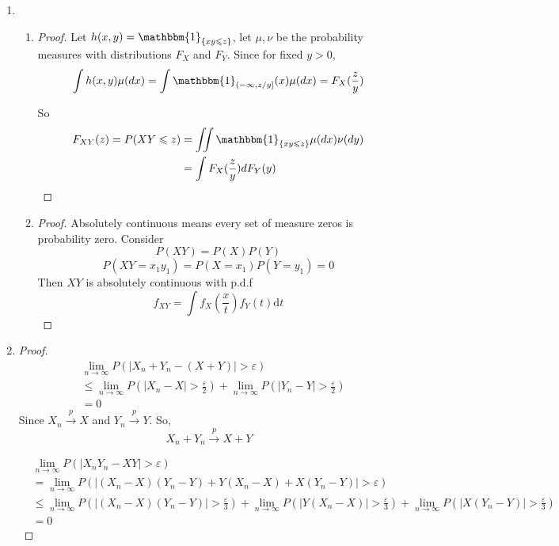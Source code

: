 \documentclass{article}
\begin{document}
\begin{enumerate}
        \item \begin{enumerate}
            \item \begin{proof} 
                Let $h(x,y)=\mathbbm{1}_{\{xy\leqslant z\}}$, let $\mu,\nu$ be the probability measures with distributions $F_X$ and $F_Y$. Since for fixed $y>0$,
                $$\int{h(x,y)\mu(dx)}=\int{\mathbbm{1}_{(-\infty,z/y]}(x)\mu(dx)}=F_X(\frac{z}{y})$$
                
                So
                \begin{align*}
                    F_{XY}(z)=P(XY\leqslant z)&=\iint{\mathbbm{1}_{\{xy\leqslant z\}}\mu(dx)\nu(dy)}\\
                    &=\int F_X(\frac{z}{y})dF_Y(y)
                \end{align*}
            \end{proof}
            \item \begin{proof}
                Absolutely continuous means every set of measure zeros is probability zero. Consider
                $$P(XY)=P(X)P(Y)$$
                $$P(XY=x_1y_1)=P(X=x_1)P(Y=y_1)=0$$
                Then $XY$ is absolutely continuous with p.d.f
                $$f_{XY}=\int f_{X}\left(\frac{x}{t}\right)f_{Y}(t) \text{d}t$$
            \end{proof}
            \end{enumerate}


        \item \begin{proof}
            \begin{align*}
                &\lim_{n\to\infty}P\left(|X_n+Y_n-(X+Y)|> \varepsilon\right)\\
                &\leqslant \lim_{n\to\infty}P\left(|X_n-X|>\frac{\varepsilon}{2}\right)+\lim_{n\to\infty}P\left(|Y_n-Y|>\frac{\varepsilon}{2}\right)\\
                &=0
            \end{align*}
            Since $X_n \overset{p}{\to} X$ and $Y_n \overset{p}{\to} Y$.
            So, $$X_n+Y_n \overset{p}{\to} X+Y$$

            \begin{align*}
                &\lim_{n\to\infty} P\left(|X_nY_n-XY|>\varepsilon\right)\\
                &=\lim_{n\to\infty} P\left(|(X_n-X)(Y_n-Y)+Y(X_n-X)+X(Y_n-Y)|>\varepsilon\right)\\
                &\leqslant\lim_{n\to\infty}P\left(|(X_n-X)(Y_n-Y)|>\frac{\varepsilon}{3}\right)+\lim_{n\to\infty}P\left(|Y(X_n-X)|>\frac{\varepsilon}{3}\right)+\lim_{n\to\infty}P\left(|X(Y_n-Y)|>\frac{\varepsilon}{3}\right)\\
                &=0
            \end{align*}
        \end{proof}


\end{enumerate}
\end{document}
